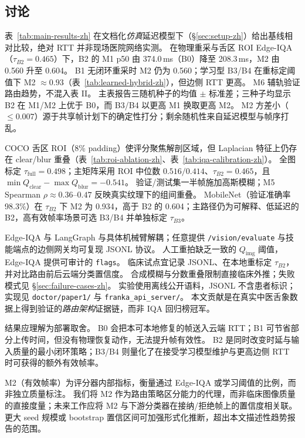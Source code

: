 \subsection{讨论}
\label{sec:discussion-zh}

表~\ref{tab:main-results-zh} 在文档化\emph{仿真}延迟模型下（\S\ref{sec:setup-zh}）给出基线相对比较，绝对 RTT 并非现场医院网络实测。
在物理重采与舌区 ROI Edge-IQA（$\tau_{B2}{=}0.465$）下，B2 的 M1 p50 由 374.0\,ms（B0）降至 208.3\,ms，M2 由 0.560 升至 0.604。
B1 无闭环重采时 M2 仍为 0.560；学习型 B3/B4 在重标定阈值下 M2 $\approx 0.93$（表~\ref{tab:learned-hybrid-zh}），但边侧 RTT 更高。
M6 辅轨验证路由趋势，不混入表 II。
主表报告三随机种子的均值 $\pm$ 标准差；三种子均显示 B2 在 M1/M2 上优于 B0，而 B3/B4 以更高 M1 换取更高 M2。
M2 方差小（$\leq 0.007$）源于共享帧计划下的确定性打分；剩余随机性来自延迟模型与帧序打乱。

COCO 舌区 ROI（8\% padding）使评分聚焦解剖区域，但 Laplacian 特征上仍存在 clear/blur 重叠（表~\ref{tab:roi-ablation-zh}、表~\ref{tab:iqa-calibration-zh}）。
全图标定 $\tau_{\mathrm{full}}{=}0.498$；主矩阵采用 ROI 中位数 $0.516/0.414$、$\tau_{B2}{=}0.465$，且 $\min Q_{\mathrm{clear}}-\max Q_{\mathrm{blur}}{=}{-}0.541$。
验证/测试集一半帧施加高斯模糊；M5 Spearman $\rho{\approx}0.36$--$0.47$ 反映真实纹理下的组间重叠。
MobileNet（验证准确率 98.3\%）在 $\tau_{B2}$ 下 M2 为 0.934，高于 B2 的 0.604；主路径仍为可解释、低延迟的 B2，高有效帧率场景可选 B3/B4 并单独标定 $\tau_{B3}$。

Edge-IQA 与 LangGraph 与具体机械臂解耦；任意提供 \texttt{/vision/evaluate} 与技能端点的边侧网关均可复现 JSONL 协议。
人工重拍缺乏一致的 $Q_{\mathrm{img}}$ 阈值，Edge-IQA 提供可审计的 \texttt{flags}。
临床试点宜记录 JSONL、在本地重标定 $\tau_{B2}$，并对比路由前后云端分类置信度。
合成模糊与分数重叠限制直接临床外推；失败模式见 \S\ref{sec:failure-cases-zh}。
实验使用离线公开语料，JSONL 不含患者标识；实现见 \texttt{doctor/paper1/} 与 \texttt{franka\_api\_server/}。
本文贡献是在真实中医舌象数据上得到验证的\emph{路由架构}证据链，而非 IQA 回归榜冠军。

结果应理解为部署取舍。
B0 会把本可本地修复的帧送入云端 RTT；B1 可节省部分上传时间，但没有物理恢复动作，无法提升帧有效性。
B2 是同时改变时延与输入质量的最小闭环策略；B3/B4 则量化了在接受学习模型维护与更高边侧 RTT 时可获得的额外有效帧率。

M2（有效帧率）为评分器内部指标，衡量通过 Edge-IQA 或学习阈值的比例，而非独立质量标注。
我们将 M2 作为路由策略区分能力的代理，而非临床图像质量的直接度量；未来工作应将 M2 与下游分类器在接纳/拒绝帧上的置信度相关联。
更大 seed 规模或 bootstrap 置信区间可加强形式化推断，超出本文描述性趋势报告的范围。
